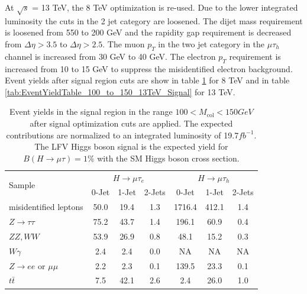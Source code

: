 \documentclass[oneside, letterpaper, oldfontcommands]{memoir}
\begin{document}
\qquad At $\sqrt{s}$ = 13 TeV, the 8 TeV optimization is re-used. Due to the lower integrated luminosity the cuts in the 2 jet category are loosened. The dijet mass requirement is loosened from 550 to 200 GeV and the rapidity gap requirement is decreased from $\Delta \eta > 3.5$ to $\Delta \eta > 2.5$. The muon $p_{T}$ in the two jet category in the $\mu \tau_{h}$ channel is increased from 30 GeV to 40 GeV. The electron $p_{T}$ requirement is increased from 10 to 15 GeV to suppress the misidentified electron background. Event yields after signal region cuts are show in table \ref{tab:EventYieldTable_100_to_150_8TeV_Signal} for 8 TeV and in table \ref{tab:EventYieldTable_100_to_150_13TeV_Signal} for 13 TeV.


 \begin{table}[hbtp]
 \centering  \caption{Event yields in the signal region in the range $100 < M_\text{col} < 150GeV$ after signal optimization cuts are applied. The expected contributions are normalized to an integrated luminosity
of 19.7$fb^{-1}$. The LFV Higgs boson signal is the expected yield for $B(H \rightarrow \mu \tau)=1\%$ with the SM Higgs boson cross section.}
  \label{tab:EventYieldTable_100_to_150_8TeV_Signal}
  \begin{tabular}{lccc|ccc} \hline
        \multirow{2}{*}{Sample}                                & \multicolumn{3}{c}{$H \rightarrow \mu \tau_{e}$}                &     \multicolumn{3}{c}{$H \rightarrow \mu \tau_{h}$}     \\ \cline{2-7}
                                              &  0-Jet            & 1-Jet            & 2-Jets               &  0-Jet             & 1-Jet            & 2-Jets  \\ \hline
    misidentified leptons                    &  50.0  &   19.4     &  1.3 & 1716.4 & 412.1 & 1.4\\
    $ Z \rightarrow \tau \tau$                    & 75.2   & 43.7      &  1.4 & 196.1   & 60.9  & 0.4  \\
    $ ZZ,WW$                       & 53.9   &  26.9      &  0.8 & 48.1   & 15.2  & 0.3\\
    $ W\gamma$                             &   2.4  &  2.4     &  0.0 &NA & NA & NA    \\
    $ Z \rightarrow ee$ or $\mu \mu$          &  2.2   &  2.3      &  0.1 & 139.5 & 23.3& 0.1  \\
    $t\bar{t}     $                            &  7.5   & 42.1      & 2.6 &2.4 & 26.0 & 1.0    \\

\end{tabular}
\end{table}
\end{document}
